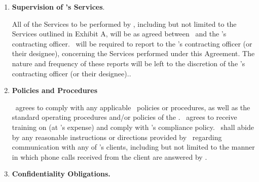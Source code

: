 \documentclass[a4paper,10pt,notitlepage,twocolumn]{article}
\begin{document}
\begin{enumerate}
 \item \textbf{Supervision of \cntrref 's Services}.
 
All of the Services to be performed by \cntrref, including but not limited to the Services outlined in Exhibit A, will be as agreed between \cntrref\ and the \clref 's contracting officer.  \cntrref\ will be required to report to the \clref 's contracting officer (or their designee), concerning the Services performed under this Agreement.  The nature and frequency of these reports will be left to the discretion of the \clref  's contracting officer (or their designee)..


\item  \textbf{Policies and Procedures}
 
\cntrref\ agrees to comply with any applicable \clref\ policies or procedures, as well as the standard operating procedures and/or policies of the \clref .  \cntrref\ agrees to receive training on (at \clref 's expense) and comply with \clref 's compliance policy.  \cntrref\ shall abide by any reasonable instructions or directions provided by \clref\ regarding communication with any of \clref 's clients, including but not limited to the manner in which phone calls received from the client are answered by \cntrref .


\item \textbf{Confidentiality Obligations.}


\end{enumerate}
\end{document}
